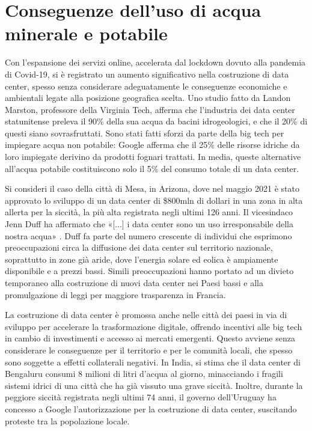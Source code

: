 \documentclass[12pt,a4paper,oneside]{book}
\begin{document}
\section{Conseguenze dell'uso di acqua minerale e potabile}

Con l'espansione dei servizi online, accelerata dal lockdown dovuto alla pandemia di Covid-19, si è registrato un aumento significativo nella costruzione di data center, spesso senza considerare adeguatamente le conseguenze economiche e ambientali legate alla posizione geografica scelta.
Uno studio fatto da Landon Marston, professore della Virginia Tech, afferma che l'industria dei data center statunitense preleva il 90\% della sua acqua da bacini idrogeologici, e che il 20\% di questi siano sovrasfruttati. Sono stati fatti sforzi da parte della big tech per impiegare acqua non potabile: Google afferma che il 25\% delle risorse idriche da loro impiegate derivino da prodotti fognari trattati. In media, queste alternative all'acqua potabile costituiscono solo il 5\% del consumo totale di un data center.

Si consideri il caso della città di Mesa, in Arizona, dove nel maggio 2021 è stato approvato lo sviluppo di un data center di \$800mln di dollari in una zona in alta allerta per la siccità, la più alta registrata negli ultimi 126 anni. Il vicesindaco Jenn Duff ha affermato che «[...] i data center sono un uso irresponsabile della nostra acqua» \cite{nbc2021drought}. Duff fa parte del numero crescente di individui che esprimono preoccupazioni circa la diffusione dei data center sul territorio nazionale, soprattutto in zone già aride, dove l'energia solare ed eolica è ampiamente disponibile e a prezzi bassi.
Simili preoccupazioni hanno portato ad un divieto temporaneo alla costruzione di nuovi data center nei Paesi bassi e alla promulgazione di leggi per maggiore trasparenza in Francia.

La costruzione di data center è promossa anche nelle città dei paesi in via di sviluppo per accelerare la trasformazione digitale, offrendo incentivi alle big tech in cambio di investimenti e accesso ai mercati emergenti. Questo avviene senza considerare le conseguenze per il territorio e per le comunità locali, che spesso sono soggette a effetti collaterali negativi.
In India, si stima che il data center di Bengaluru consumi 8 milioni di litri d'acqua al giorno, minacciando i fragili sistemi idrici di una città che ha già vissuto una grave siccità.
Inoltre, durante la peggiore siccità registrata negli ultimi 74 anni, il governo dell'Uruguay ha concesso a Google l'autorizzazione per la costruzione di data center, suscitando proteste tra la popolazione locale.
\end{document}
